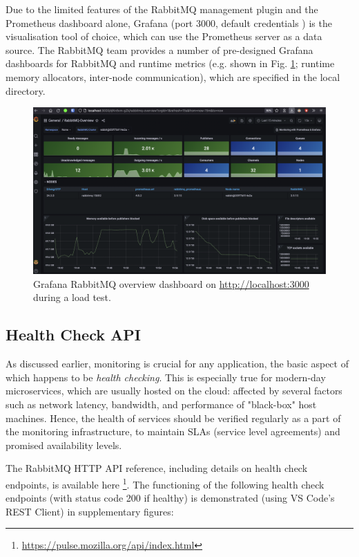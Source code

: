 Due to the limited features of the RabbitMQ management plugin and the Prometheus dashboard alone, Grafana (port 3000, default credentials ) is the visualisation tool of choice, which can use the Prometheus server as a data source. The RabbitMQ team provides a number of pre-designed Grafana dashboards for RabbitMQ and runtime metrics (e.g.  shown in Fig. \ref{fig:grafana-overview}; runtime memory allocators, inter-node communication), which are specified in the local  directory.

\begin{figure}[H]
  \centering
  \includegraphics[width=1.0\linewidth]{./assets/images/case-study-02/grafana-overview.png}
  \caption{Grafana RabbitMQ overview dashboard on \url{http://localhost:3000} during a load test.}
  \label{fig:grafana-overview}
\end{figure}


\subsection{Health Check API}

As discussed earlier, monitoring is crucial for any application, the basic aspect of which happens to be \textit{health checking}. This is especially true for modern-day microservices, which are usually hosted on the cloud: affected by several factors such as network latency, bandwidth, and performance of "black-box" host machines. Hence, the health of services should be verified regularly as a part of the monitoring infrastructure, to maintain SLAs (service level agreements) and promised availability levels.

The RabbitMQ HTTP API reference, including details on health check endpoints, is available here \footnote{\url{https://pulse.mozilla.org/api/index.html}}. The functioning of the following health check endpoints (with status code 200 if healthy) is demonstrated (using VS Code's REST Client) in supplementary figures:

